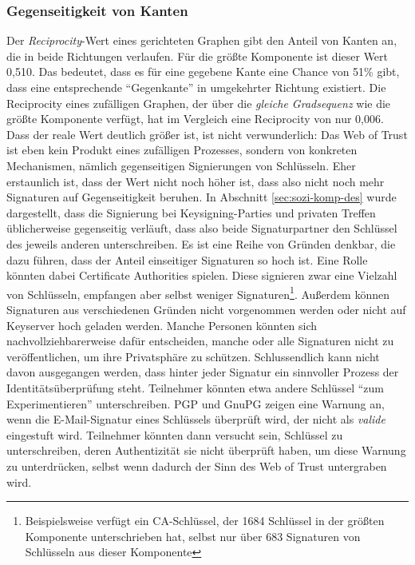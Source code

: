 \subsubsection{Gegenseitigkeit von Kanten}
\label{sec:gegens-von-kant}

Der \emph{Reciprocity}-Wert eines gerichteten Graphen gibt den Anteil
von Kanten an, die in beide Richtungen verlaufen. Für die größte
Komponente ist dieser Wert 0,510. Das bedeutet, dass es für eine
gegebene Kante eine Chance von 51\% gibt, dass eine entsprechende
"`Gegenkante"' in umgekehrter Richtung existiert. Die Reciprocity
eines zufälligen Graphen, der über die \emph{gleiche Gradsequenz}
wie die größte Komponente verfügt, hat im Vergleich eine
Reciprocity von nur 0,006. Dass der reale Wert deutlich größer ist,
ist nicht verwunderlich: Das Web of Trust ist eben kein Produkt eines
zufälligen Prozesses, sondern von konkreten Mechanismen, nämlich
gegenseitigen Signierungen von Schlüsseln. Eher erstaunlich ist,
dass der Wert nicht noch höher ist, dass also nicht noch mehr
Signaturen auf Gegenseitigkeit beruhen. In Abschnitt
\ref{sec:sozi-komp-des} wurde dargestellt, dass die Signierung bei
Keysigning-Parties und privaten Treffen üblicherweise gegenseitig
verläuft, dass also beide Signaturpartner den Schlüssel des
jeweils anderen unterschreiben. Es ist eine Reihe von Gründen
denkbar, die dazu führen, dass der Anteil einseitiger Signaturen so
hoch ist. Eine Rolle könnten dabei Certificate Authorities
spielen. Diese signieren zwar eine Vielzahl von Schlüsseln,
empfangen aber selbst weniger Signaturen\footnote{Beispielsweise
  verfügt ein CA-Schlüssel, der 1684 Schlüssel in der größten
  Komponente unterschrieben hat, selbst nur über 683 Signaturen von
  Schlüsseln aus dieser Komponente}. Außerdem können Signaturen
aus verschiedenen Gründen nicht vorgenommen werden oder nicht auf
Keyserver hoch geladen werden. Manche Personen könnten sich
nachvollziehbarerweise dafür entscheiden, manche oder alle
Signaturen nicht zu veröffentlichen, um ihre Privatsphäre zu
schützen. Schlussendlich kann nicht davon ausgegangen werden, dass
hinter jeder Signatur ein sinnvoller Prozess der
Identitätsüberprüfung steht. Teilnehmer könnten etwa andere
Schlüssel "`zum Experimentieren"' unterschreiben. PGP und GnuPG
zeigen eine Warnung an, wenn die E-Mail-Signatur eines Schlüssels
überprüft wird, der nicht als \emph{valide} eingestuft
wird. Teilnehmer könnten dann versucht sein, Schlüssel zu
unterschreiben, deren Authentizität sie nicht überprüft haben,
um diese Warnung zu unterdrücken, selbst wenn dadurch der Sinn des
Web of Trust untergraben wird.

